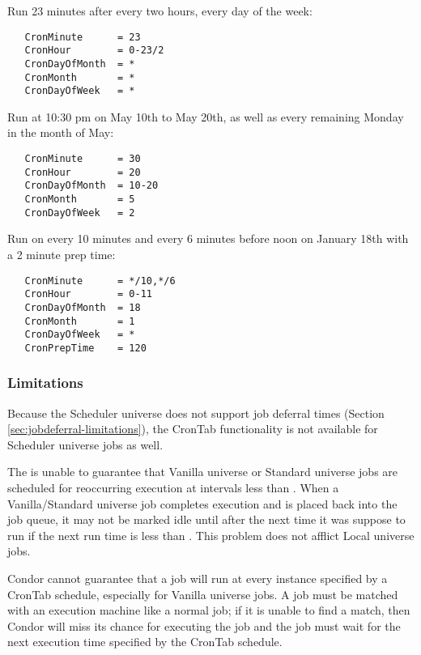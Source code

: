 Run 23 minutes after every two hours, every day of the week:

\begin{verbatim}
   CronMinute      = 23
   CronHour        = 0-23/2
   CronDayOfMonth  = *
   CronMonth       = *
   CronDayOfWeek   = *
\end{verbatim}

Run at 10:30 pm on May 10th to May 20th, as well as every 
remaining Monday in the month of May:

\begin{verbatim}
   CronMinute      = 30
   CronHour        = 20
   CronDayOfMonth  = 10-20
   CronMonth       = 5
   CronDayOfWeek   = 2
\end{verbatim}

Run on every 10 minutes and every 6 minutes before noon 
on January 18th with a 2 minute prep time:

\begin{verbatim}
   CronMinute      = */10,*/6
   CronHour        = 0-11
   CronDayOfMonth  = 18
   CronMonth       = 1
   CronDayOfWeek   = *
   CronPrepTime    = 120
\end{verbatim}

\subsubsection{Limitations}
\label{sec:crontab-limitations}
Because the Scheduler universe does not support job deferral times (Section \ref{sec:jobdeferral-limitations}), the CronTab functionality is not available for Scheduler universe jobs as well.

The  is unable to guarantee that Vanilla universe or Standard universe jobs are scheduled for reoccurring execution at intervals less than . When a Vanilla/Standard universe job completes execution and is placed back into the job queue, it may not be marked idle until after the next time it was suppose to run if the next run time is less than . This problem does not afflict Local universe jobs.

Condor cannot guarantee that a job will run at every instance specified by a CronTab schedule, especially for Vanilla universe jobs. A job must be matched with an execution machine like a normal job; if it is unable to find a match, then Condor will miss its chance for executing the job and the job must wait for the next execution time specified by the CronTab schedule.

